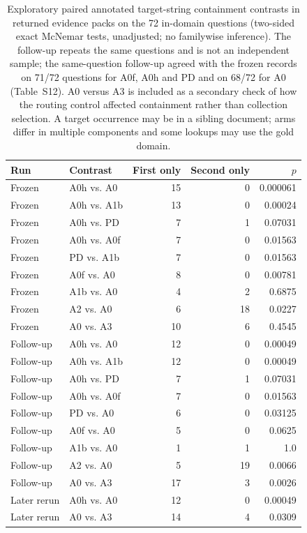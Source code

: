 \begin{table}[t]
\centering\small
\caption{Exploratory paired annotated target-string containment contrasts in
returned evidence packs on the 72 in-domain questions (two-sided exact
McNemar tests, unadjusted; no familywise inference). The follow-up repeats the
same questions and is not an independent sample; the same-question follow-up
agreed with the frozen records on 71/72 questions for A0f, A0h and PD and
on 68/72 for A0 (Table~S12). A0 versus A3 is included as a
secondary check of how the routing control affected containment rather
than collection selection. A target occurrence
may be in a sibling document; arms differ in multiple components and some
lookups may use the gold domain.}
\label{tab:s-paired-data}
\begin{tabular}{llrrr}
\toprule
Run & Contrast & First only & Second only & $p$ \\
\midrule
Frozen & A0h vs. A0 & 15 & 0 & 0.000061 \\
Frozen & A0h vs. A1b & 13 & 0 & 0.00024 \\
Frozen & A0h vs. PD & 7 & 1 & 0.07031 \\
Frozen & A0h vs. A0f & 7 & 0 & 0.01563 \\
Frozen & PD vs. A1b & 7 & 0 & 0.01563 \\
Frozen & A0f vs. A0 & 8 & 0 & 0.00781 \\
Frozen & A1b vs. A0 & 4 & 2 & 0.6875 \\
Frozen & A2 vs. A0 & 6 & 18 & 0.0227 \\
Frozen & A0 vs. A3 & 10 & 6 & 0.4545 \\
Follow-up & A0h vs. A0 & 12 & 0 & 0.00049 \\
Follow-up & A0h vs. A1b & 12 & 0 & 0.00049 \\
Follow-up & A0h vs. PD & 7 & 1 & 0.07031 \\
Follow-up & A0h vs. A0f & 7 & 0 & 0.01563 \\
Follow-up & PD vs. A0 & 6 & 0 & 0.03125 \\
Follow-up & A0f vs. A0 & 5 & 0 & 0.0625 \\
Follow-up & A1b vs. A0 & 1 & 1 & 1.0 \\
Follow-up & A2 vs. A0 & 5 & 19 & 0.0066 \\
Follow-up & A0 vs. A3 & 17 & 3 & 0.0026 \\
Later rerun & A0h vs. A0 & 12 & 0 & 0.00049 \\
Later rerun & A0 vs. A3 & 14 & 4 & 0.0309 \\
\bottomrule
\end{tabular}
\end{table}
